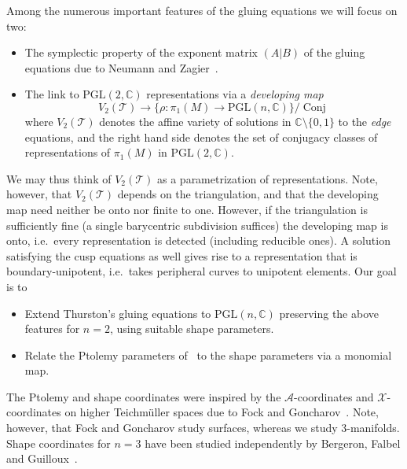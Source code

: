 \documentclass[12pt]{amsart}
\theoremstyle{definition}
\numberwithin{equation}{section}
\def\BC{\mathbb C}
\def\PGL{\mathrm{PGL}}
\DeclareMathOperator{\Conj}{Conj}
\def\CT{\mathcal T}
\def\C{\mathbb{C}}
\def\T{\mathcal{T}}
\begin{document}
Among the numerous important features of the gluing equations we will focus
on two:
\begin{itemize}
\item[(a)] The symplectic property of the exponent matrix $(A \vert B)$
of the gluing equations due to Neumann and Zagier~\cite{NeumannZagier}.%
\item[(b)] The link to $\PGL(2,\BC)$ representations via a 
\emph{developing map}
\begin{equation}\label{eq.dev2}
V_2(\CT) \to \{\rho\colon\pi_1(M)\to\PGL(n,\C)\}\big/\Conj
\end{equation}
where  $V_2(\T)$ denotes the affine variety of solutions in 
$\C\setminus\{0,1\}$ to the \emph{edge} equations, and the right hand side denotes the set of conjugacy classes of representations of $\pi_1(M)$ in $\PGL(2,\C)$. 

\end{itemize}
We may thus think of $V_2(\T)$ as a parametrization of representations. Note, however, that $V_2(\T)$ depends on the triangulation, and that the developing map need neither be onto nor finite to one. However, if the triangulation is sufficiently fine (a single barycentric subdivision suffices) the developing map is onto, i.e.~every representation is detected (including reducible ones). A solution satisfying the cusp equations as well gives rise to a representation that is boundary-unipotent, i.e.~takes peripheral curves to unipotent elements. Our goal is to
\begin{itemize}
\item
Extend Thurston's gluing equations to $\PGL(n,\BC)$ preserving the above
features for $n=2$, using suitable shape parameters.
\item
Relate the Ptolemy parameters of~\cite{GaroufalidisThurstonZickert}
to the shape parameters via a monomial map.
\end{itemize}

The Ptolemy and shape coordinates were inspired by the $\mathcal A$-coordinates
and $\mathcal X$-coordinates on higher Teichm\"{u}ller spaces due to Fock and 
Goncharov~\cite{FockGoncharov}. Note, however, that Fock and 
Goncharov study surfaces, whereas we study 3-manifolds. Shape coordinates for $n=3$ have been studied independently by Bergeron, Falbel and Guilloux~\cite{FrenchPeople}.
\end{document}

